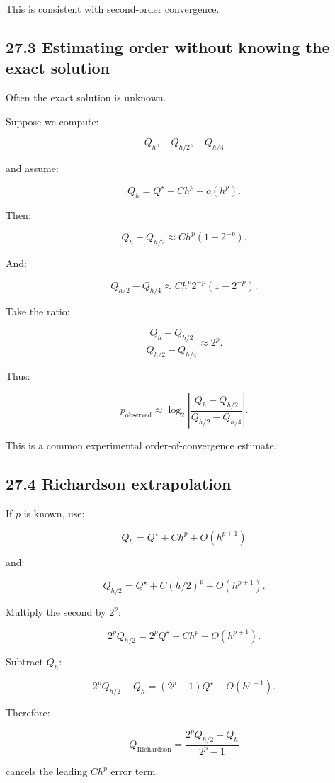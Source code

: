 This is consistent with second-order convergence.

\subsection{27.3 Estimating order without knowing the exact solution}\label{02-foundations-ii-ch029-estimating-order-without-knowing-the-exact-solution}

Often the exact solution is unknown.

Suppose we compute:

\[ Q_h,\quad Q_{h/2},\quad Q_{h/4} \]

and assume:

\[ Q_h=Q^\star+Ch^p+o(h^p). \]

Then:

\[ Q_h-Q_{h/2} \approx Ch^p(1-2^{-p}). \]

And:

\[ Q_{h/2}-Q_{h/4} \approx Ch^p2^{-p}(1-2^{-p}). \]

Take the ratio:

\[ \frac{Q_h-Q_{h/2}} {Q_{h/2}-Q_{h/4}} \approx 2^p. \]

Thus:

\[ \boxed{ p_{\mathrm{observed}} \approx \log_2\left| \frac{Q_h-Q_{h/2}} {Q_{h/2}-Q_{h/4}} \right| }. \]

This is a common experimental order-of-convergence estimate.

\subsection{27.4 Richardson extrapolation}\label{02-foundations-ii-ch029-richardson-extrapolation}

If \(p\) is known, use:

\[ Q_h=Q^\star+Ch^p+O(h^{p+1}) \]

and:

\[ Q_{h/2}=Q^\star+C(h/2)^p+O(h^{p+1}). \]

Multiply the second by \(2^p\):

\[ 2^pQ_{h/2} = 2^pQ^\star+Ch^p+O(h^{p+1}). \]

Subtract \(Q_h\):

\[ 2^pQ_{h/2}-Q_h = (2^p-1)Q^\star+O(h^{p+1}). \]

Therefore:

\[ \boxed{ Q_{\mathrm{Richardson}} = \frac{2^pQ_{h/2}-Q_h}{2^p-1} } \]

cancels the leading \(Ch^p\) error term.

